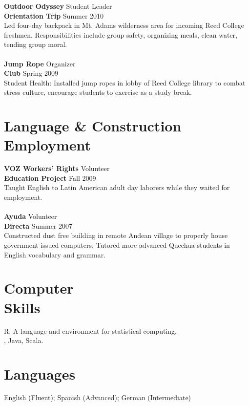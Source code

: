\documentclass[margin,line]{resume}
\begin{document}
\begin{resume}
\textbf{Outdoor Odyssey} \hfill Student Leader \\
\textbf{Orientation Trip} \hfill Summer 2010 \\
Led four-day backpack in Mt. Adams wilderness area for incoming Reed College freshmen. Responsibilities include group safety, organizing meals, clean water, tending group moral.
\\\vspace{-2mm}\\
\textbf{Jump Rope} \hfill Organizer
\\\textbf{Club}  \hfill Spring 2009\\
Student Health: Installed jump ropes in lobby of Reed College library to combat stress culture, encourage students to exercise as a study break. 



	\section{\mysidestyle Language \& Construction \\ Employment}
\textbf{VOZ Workers' Rights}  \hfill Volunteer \\ \textbf{Education Project} \hfill Fall 2009 \\ Taught English to Latin American adult day laborers while they waited for employment. \\
\vspace{-2mm}\\    
\textbf{Ayuda} \hfill Volunteer \\    
\textbf{Directa} \hfill Summer 2007	\\
Constructed dust free building in remote Andean village to properly house government issued computers. Tutored more advanced Quechua students in English vocabulary and grammar.    


    \section{\mysidestyle Computer \\ Skills}
 R: A language and environment for statistical computing, \\  \LaTeXe,  Java, Scala.
    \section{\mysidestyle Languages}
English (Fluent);
Spanish (Advanced);
German (Intermediate)


\end{resume}
\end{document}
